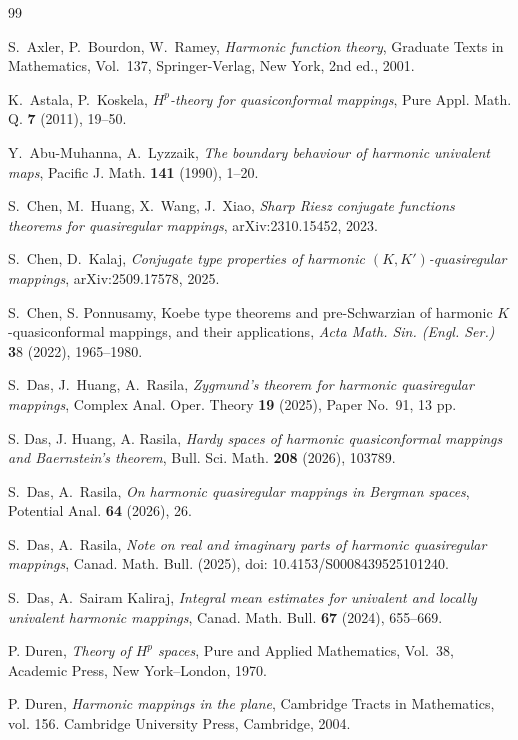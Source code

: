 \documentclass[12pt, reqno]{amsart}
\begin{document}
\begin{thebibliography}{99}

S.~Axler, P.~Bourdon, W.~Ramey,
\textit{Harmonic function theory},
Graduate Texts in Mathematics, Vol.~137,
Springer-Verlag, New York, 2nd ed., 2001.

K.~Astala, P.~Koskela,
\textit{$H^{p}$-theory for quasiconformal mappings},
Pure Appl. Math. Q. \textbf{7} (2011), 19--50.

Y.~Abu-Muhanna, A.~Lyzzaik,
\textit{The boundary behaviour of harmonic univalent maps},
Pacific J. Math. \textbf{141} (1990), 1--20.

S.~Chen, M.~Huang, X.~Wang, J.~Xiao,
\textit{Sharp Riesz conjugate functions theorems for quasiregular mappings},
arXiv:2310.15452, 2023.

S.~Chen, D.~Kalaj,
\textit{Conjugate type properties of harmonic $(K,K')$-quasiregular mappings},
arXiv:2509.17578, 2025.

S.~Chen, S. Ponnusamy, Koebe type theorems and pre-Schwarzian of harmonic $K$-quasiconformal mappings, and their applications, \textit{Acta Math. Sin. (Engl. Ser.)} {\textbf 38} (2022), 1965--1980.


S.~Das, J.~Huang, A.~Rasila,
\textit{Zygmund's theorem for harmonic quasiregular mappings},
Complex Anal. Oper. Theory \textbf{19} (2025), Paper No.~91, 13 pp.

S. Das, J. Huang, A. Rasila, \textit{Hardy spaces of harmonic quasiconformal mappings and Baernstein's theorem}, Bull. Sci. Math. \textbf{208} (2026), 103789.



 S.~Das, A.~Rasila,
\textit{On harmonic quasiregular mappings in Bergman spaces},
Potential Anal. \textbf{64} (2026), 26.

S.~Das, A.~Rasila,
\textit{Note on real and imaginary parts of harmonic quasiregular mappings},
Canad. Math. Bull. (2025), doi: 10.4153/S0008439525101240.

S.~Das, A.~Sairam Kaliraj,
\textit{Integral mean estimates for univalent and locally univalent harmonic mappings},
Canad. Math. Bull. \textbf{67} (2024), 655--669.

 P. Duren,
\textit{Theory of $H^{p}$ spaces},
Pure and Applied Mathematics, Vol.~38,
Academic Press, New York--London, 1970.

 P. Duren,
\textit{Harmonic mappings in the plane},
Cambridge Tracts in Mathematics, vol. 156. Cambridge University Press, Cambridge, 2004.



\end{thebibliography}
\end{document}
